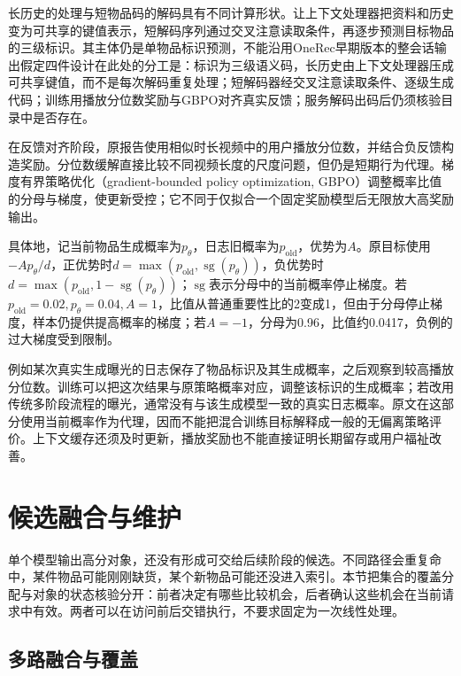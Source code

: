 长历史的处理与短物品码的解码具有不同计算形状。让上下文处理器把资料和历史变为可共享的键值表示，短解码序列通过交叉注意读取条件，再逐步预测目标物品的三级标识。其主体仍是单物品标识预测，不能沿用OneRec早期版本的整会话输出假定四件设计在此处的分工是：标识为三级语义码，长历史由上下文处理器压成可共享键值，而不是每次解码重复处理；短解码器经交叉注意读取条件、逐级生成代码；训练用播放分位数奖励与GBPO对齐真实反馈；服务解码出码后仍须核验目录中是否存在。

在反馈对齐阶段，原报告使用相似时长视频中的用户播放分位数，并结合负反馈构造奖励。分位数缓解直接比较不同视频长度的尺度问题，但仍是短期行为代理。梯度有界策略优化（gradient-bounded policy optimization, GBPO）调整概率比值的分母与梯度，使更新受控；它不同于仅拟合一个固定奖励模型后无限放大高奖励输出。

具体地，记当前物品生成概率为$p_\theta$，日志旧概率为$p_{\mathrm{old}}$，优势为$A$。原目标使用$-A p_\theta/d$，正优势时$d=\max(p_{\mathrm{old}},\operatorname{sg}(p_\theta))$，负优势时$d=\max(p_{\mathrm{old}},1-\operatorname{sg}(p_\theta))$；$\operatorname{sg}$表示分母中的当前概率停止梯度。若$p_{\mathrm{old}}=0.02,p_\theta=0.04,A=1$，比值从普通重要性比的2变成1，但由于分母停止梯度，样本仍提供提高概率的梯度；若$A=-1$，分母为0.96，比值约0.0417，负例的过大梯度受到限制。

例如某次真实生成曝光的日志保存了物品标识及其生成概率，之后观察到较高播放分位数。训练可以把这次结果与原策略概率对应，调整该标识的生成概率；若改用传统多阶段流程的曝光，通常没有与该生成模型一致的真实日志概率。原文在这部分使用当前概率作为代理，因而不能把混合训练目标解释成一般的无偏离策略评价。上下文缓存还须及时更新，播放奖励也不能直接证明长期留存或用户福祉改善。

\section{候选融合与维护}
\label{sec:rs-candidate-management}

单个模型输出高分对象，还没有形成可交给后续阶段的候选。不同路径会重复命中，某件物品可能刚刚缺货，某个新物品可能还没进入索引。本节把集合的覆盖分配与对象的状态核验分开：前者决定有哪些比较机会，后者确认这些机会在当前请求中有效。两者可以在访问前后交错执行，不要求固定为一次线性处理。

\subsection{多路融合与覆盖}
\label{sec:rs-candidate-fusion}


